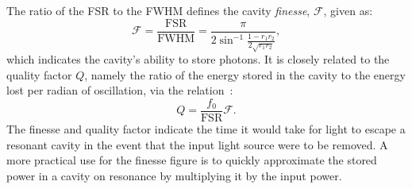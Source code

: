 The ratio of the \gls{FSR} to the \gls{FWHM} defines the cavity \emph{finesse}, $\mathcal{F}$, given as:
\begin{equation}
  \mathcal{F} = \frac{\text{FSR}}{\text{FWHM}} = \frac{\pi}{2 \sin^{-1}{\frac{1 - r_1 r_2}{2 \sqrt{r_1 r_2}}}},
\end{equation}
which indicates the cavity's ability to store photons. It is closely related to the quality factor $Q$, namely the ratio of the energy stored in the cavity to the energy lost per radian of oscillation, via the relation~\cite{Band2006}:
\begin{equation}
Q = \frac{f_0}{\text{FSR}} \mathcal{F}.
\end{equation}
The finesse and quality factor indicate the time it would take for light to escape a resonant cavity in the event that the input light source were to be removed. A more practical use for the finesse figure is to quickly approximate the stored power in a cavity on resonance by multiplying it by the input power.

